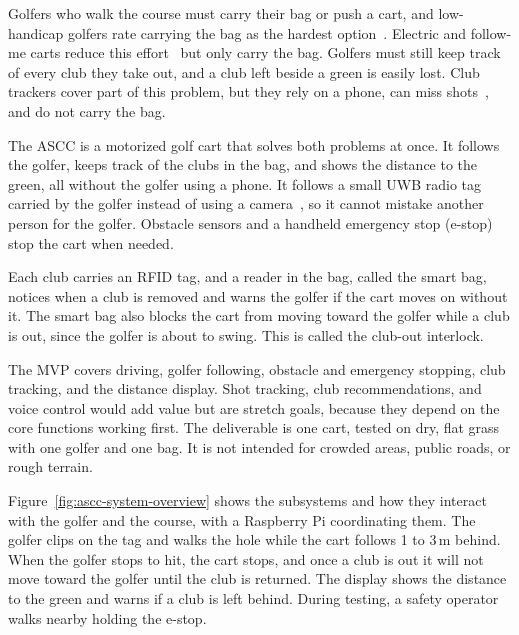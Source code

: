 \label{sec:introduction}


Golfers who walk the course must carry their bag or push a cart, and low-handicap golfers rate carrying the bag as the hardest option~\cite{kasper2023golf}. Electric and follow-me carts reduce this effort~\cite{kasper2023golf} but only carry the bag. Golfers must still keep track of every club they take out, and a club left beside a green is easily lost. Club trackers cover part of this problem, but they rely on a phone, can miss shots~\cite{hall2025golfGps}, and do not carry the bag.


The \ac{ASCC} is a motorized golf cart that solves both problems at once. It follows the golfer, keeps track of the clubs in the bag, and shows the distance to the green, all without the golfer using a phone. It follows a small \ac{UWB} radio tag carried by the golfer instead of using a camera~\cite{islam2019personFollowing}, so it cannot mistake another person for the golfer. Obstacle sensors and a handheld emergency stop (e-stop) stop the cart when needed.

Each club carries an \ac{RFID} tag, and a reader in the bag, called the smart bag, notices when a club is removed and warns the golfer if the cart moves on without it. The smart bag also blocks the cart from moving toward the golfer while a club is out, since the golfer is about to swing. This is called the club-out interlock.


The \ac{MVP} covers driving, golfer following, obstacle and emergency stopping, club tracking, and the distance display. Shot tracking, club recommendations, and voice control would add value but are stretch goals, because they depend on the core functions working first. The deliverable is one cart, tested on dry, flat grass with one golfer and one bag. It is not intended for crowded areas, public roads, or rough terrain.


Figure~\ref{fig:ascc-system-overview} shows the subsystems and how they interact with the golfer and the course, with a Raspberry Pi coordinating them. The golfer clips on the tag and walks the hole while the cart follows 1 to 3\,m behind. When the golfer stops to hit, the cart stops, and once a club is out it will not move toward the golfer until the club is returned. The display shows the distance to the green and warns if a club is left behind. During testing, a safety operator walks nearby holding the e-stop.

